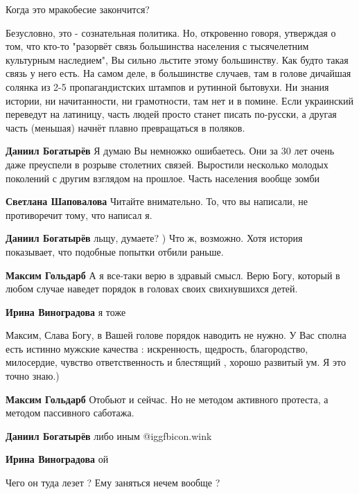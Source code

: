 \begin{itemize}
Когда это мракобесие закончится?


Безусловно, это - сознательная политика. Но, откровенно говоря, утверждая о
том, что кто-то "разорвёт связь большинства населения с тысячелетним культурным
наследием", Вы сильно льстите этому большинству. Как будто такая связь у него
есть. На самом деле, в большинстве случаев, там в голове дичайшая солянка из
2-5 пропагандистских штампов и рутинной бытовухи. Ни знания истории, ни
начитанности, ни грамотности, там нет и в помине. Если украинский переведут на
латиницу, часть людей просто станет писать по-русски, а другая часть (меньшая)
начнёт плавно превращаться в поляков.

\begin{itemize} %
\textbf{Даниил Богатырёв} Я думаю Вы немножко ошибаетесь. Они за 30 лет очень даже преуспели в розрыве столетних связей. Выростили несколько молодых поколений с другим взглядом на прошлое. Часть населения вообще зомби

\textbf{Светлана Шаповалова} Читайте внимательно. То, что вы написали, не противоречит тому, что написал я.

\textbf{Даниил Богатырёв} льщу, думаете? ) Что ж, возможно. Хотя история показывает, что подобные попытки отбили раньше.

\textbf{Максим Гольдарб} А я все-таки верю в здравый смысл. Верю Богу, который в любом случае наведет порядок в головах своих свихнувшихся детей.

\textbf{Ирина Виноградова} я тоже

Максим, Слава Богу, в Вашей голове порядок наводить не нужно. У Вас сполна есть истинно мужские качества : искренность, щедрость, благородство, милосердие, чувство ответственность и блестящий , хорошо развитый ум. Я это точно знаю.)

\textbf{Максим Гольдарб} Отобьют и сейчас. Но не методом активного протеста, а методом пассивного саботажа.

\textbf{Даниил Богатырёв} либо иным  @igg{fbicon.wink} 

\textbf{Ирина Виноградова} ой

\end{itemize} %

Чего он туда лезет ? Ему заняться нечем вообще ?


\end{itemize}
